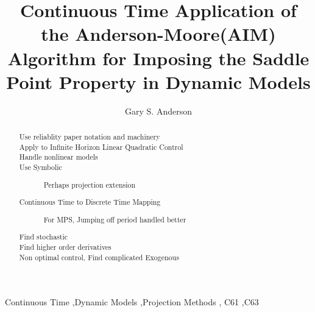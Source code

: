 \documentclass[1p]{elsarticle}
\begin{document}
\begin{frontmatter}
\title{Continuous Time Application of the Anderson-Moore(AIM) Algorithm for
Imposing the Saddle Point Property in Dynamic Models}
\author{Gary S. Anderson}
\address{Federal Reserve Board}
 

\begin{abstract}
  \begin{description}
  \item[Use reliablity paper notation and machinery] 
  \item[Apply to Infinite Horizon Linear Quadratic Control]
  \item[Handle nonlinear models] 
  \item[Use Symbolic] Perhaps projection extension
  \item[Continuous Time to Discrete Time Mapping] For MPS, 
Jumping off period handled better
\item[Find stochastic]
\item[Find higher order derivatives]
\item[Non optimal control, Find complicated Exogenous] 
  \end{description}

\end{abstract}

\begin{keyword}
Continuous Time \sep Dynamic Models \sep    Projection Methods \sep
C61 \sep  C63 
\end{keyword}
\end{frontmatter}




% 
\end{document}
